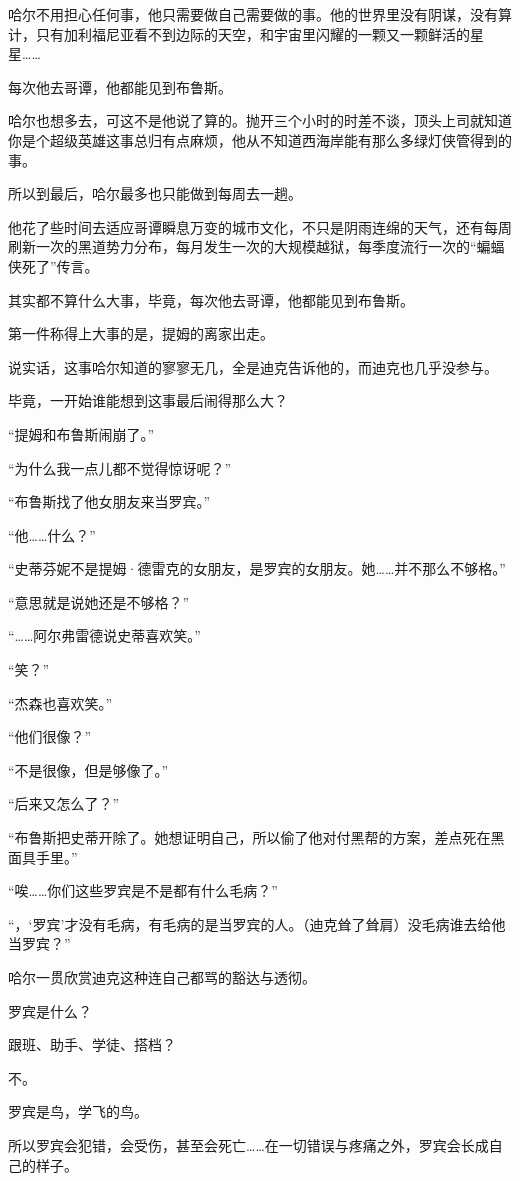 \documentclass[../main]{subfiles}
\begin{document}
哈尔不用担心任何事，他只需要做自己需要做的事。他的世界里没有阴谋，没有算计，只有加利福尼亚看不到边际的天空，和宇宙里闪耀的一颗又一颗鲜活的星星……

每次他去哥谭，他都能见到布鲁斯。

哈尔也想多去，可这不是他说了算的。抛开三个小时的时差不谈，顶头上司就知道你是个超级英雄这事总归有点麻烦，他从不知道西海岸能有那么多绿灯侠管得到的事。

所以到最后，哈尔最多也只能做到每周去一趟。

他花了些时间去适应哥谭瞬息万变的城市文化，不只是阴雨连绵的天气，还有每周刷新一次的黑道势力分布，每月发生一次的大规模越狱，每季度流行一次的“蝙蝠侠死了”传言。

其实都不算什么大事，毕竟，每次他去哥谭，他都能见到布鲁斯。

第一件称得上大事的是，提姆的离家出走。

说实话，这事哈尔知道的寥寥无几，全是迪克告诉他的，而迪克也几乎没参与。

毕竟，一开始谁能想到这事最后闹得那么大？

“提姆和布鲁斯闹崩了。”

“为什么我一点儿都不觉得惊讶呢？”

“布鲁斯找了他女朋友来当罗宾。”

“他……什么？”

“史蒂芬妮不是提姆·德雷克的女朋友，是罗宾的女朋友。她……并不那么不够格。”

“意思就是说她还是不够格？”

“……阿尔弗雷德说史蒂喜欢笑。”

“笑？”

“杰森也喜欢笑。”

“他们很像？”

“不是很像，但是够像了。”

“后来又怎么了？”

“布鲁斯把史蒂开除了。她想证明自己，所以偷了他对付黑帮的方案，差点死在黑面具手里。”

“唉……你们这些罗宾是不是都有什么毛病？”

“，`罗宾'才没有毛病，有毛病的是当罗宾的人。（迪克耸了耸肩）没毛病谁去给他当罗宾？”

哈尔一贯欣赏迪克这种连自己都骂的豁达与透彻。

罗宾是什么？

跟班、助手、学徒、搭档？

不。

罗宾是鸟，学飞的鸟。

所以罗宾会犯错，会受伤，甚至会死亡……在一切错误与疼痛之外，罗宾会长成自己的样子。
\end{document}
